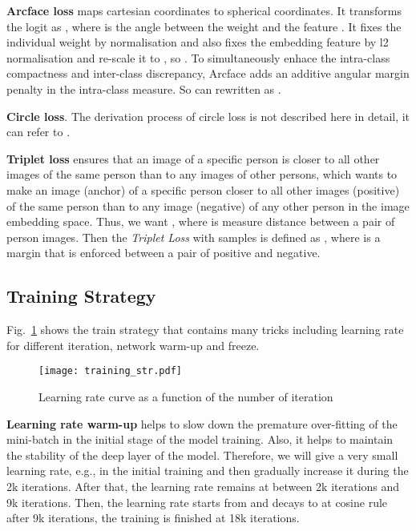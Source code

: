 \documentclass[10pt,twocolumn,letterpaper]{article}
\begin{document}
\noindent\textbf{Arcface loss} \cite{deng2019arcface} maps cartesian coordinates to spherical coordinates. It transforms the logit as , where  is the angle between the weight  and the feature . It fixes the individual weight  by  normalisation and also fixes the embedding feature  by l2 normalisation and re-scale it to , so . To simultaneously enhace the intra-class compactness and inter-class discrepancy, Arcface adds an additive angular margin penalty  in the intra-class measure. So  can rewritten as .

\noindent\textbf{Circle loss}. The derivation process of circle loss is not described here in detail, it can refer to \cite{sun2020circle}.

\noindent\textbf{Triplet loss} ensures that an image of a specific person is closer to all other images of the same person than  to any images of other persons, which wants to make an image  (anchor) of a specific person  closer to all other images  (positive) of the same person than to any image  (negative) of any other person in the image embedding space. Thus, we want , where  is measure distance between a pair of person images. Then the \emph{Triplet Loss} with  samples is defined as , where  is a margin that is enforced between a pair of positive and negative.

\subsection{Training Strategy}
Fig.~\ref{fig5} shows the train strategy that contains many tricks including learning rate for different iteration, network warm-up and freeze.
\begin{figure}[htp]
    \centering
       \vspace{0em}
    \texttt{[image: training\_str.pdf]}
     \caption{Learning rate curve as a function of the number of iteration}
    \label{fig5}
\end{figure}

\noindent\textbf{Learning rate warm-up} helps to slow down the premature over-fitting of the mini-batch in the initial stage of the model training. Also, it helps to maintain the stability of the deep layer of the model. Therefore, we will give a very small learning rate, e.g.,  in the initial training and then gradually increase it during the 2k iterations. After that, the learning rate remains at  between 2k iterations and 9k iterations. Then, the learning rate starts from  and decays to  at cosine rule after 9k iterations, the training is finished at 18k iterations.
\end{document}
